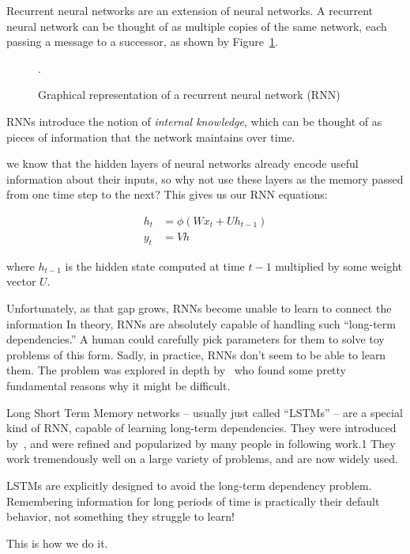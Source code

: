 Recurrent neural networks are an extension of neural networks. A recurrent neural
network can be thought of as multiple copies of the same network, each
passing a message to a successor, as shown by Figure~\ref{fig:rnn}.

\begin{figure}[!htbp]
    \centering
    
    \caption{Graphical representation of a recurrent neural network (RNN)}.\label{fig:rnn}
\end{figure}

RNNs introduce the notion of \textit{internal knowledge}, which can be thought of
as pieces of information that the network maintains over time.

we know that the hidden layers of neural networks already encode useful
information about their inputs, so why not use these layers as the memory passed
from one time step to the next? This gives us our RNN equations:

\begin{align*}
    h_t & = \phi(Wx_t + Uh_{t-1}) \\
    y_t & = Vh
    \end{align*}

where \(h_{t-1}\) is the hidden state computed at time \(t-1\) multiplied by
some weight vector \(U\).

Unfortunately, as that gap grows, RNNs become unable to learn to connect the
information In theory, RNNs are absolutely capable of handling such “long-term
dependencies.” A human could carefully pick parameters for them to solve toy
problems of this form. Sadly, in practice, RNNs don’t seem to be able to learn
them. The problem was explored in depth by~\cite{Bengio1994} who found some
pretty fundamental reasons why it might be difficult.

Long Short Term Memory networks – usually just called “LSTMs” – are a special
kind of RNN, capable of learning long-term dependencies. They were introduced by~\cite{Hochreiter1997},
and were refined and popularized by many people
in following work.1 They work tremendously well on a large variety of problems,
and are now widely used.

LSTMs are explicitly designed to avoid the long-term dependency problem.
Remembering information for long periods of time is practically their default
behavior, not something they struggle to learn!

This is how we do it.

